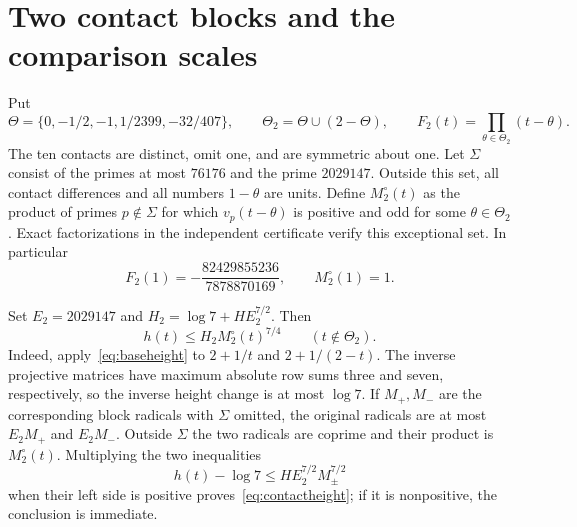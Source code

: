 \documentclass[11pt,a4paper]{article}
\begin{document}
\section{Two contact blocks and the comparison scales}
Put
\[
 \Theta=\{0,-1/2,-1,1/2399,-32/407\},\qquad
 \Theta_2=\Theta\cup(2-\Theta),\qquad
 F_2(t)=\prod_{\theta\in\Theta_2}(t-\theta).
\]
The ten contacts are distinct, omit one, and are symmetric about one.
Let $\Sigma$ consist of the primes at most $76176$ and the prime
$2029147$. Outside this set, all contact differences and all numbers
$1-\theta$ are units. Define $M_2^\circ(t)$ as the product of primes
$p\notin\Sigma$ for which $v_p(t-\theta)$ is positive and odd for
some $\theta\in\Theta_2$. Exact factorizations in the independent
certificate verify this exceptional set. In particular
\[
 F_2(1)=-\frac{82429855236}{7878870169},\qquad M_2^\circ(1)=1.
\]

Set $E_2=2029147$ and $H_2=\log7+HE_2^{7/2}$. Then
\begin{equation}\label{eq:contactheight}
                   h(t)\le H_2M_2^\circ(t)^{7/4}
                   \qquad(t\notin\Theta_2).
\end{equation}
Indeed, apply~\eqref{eq:baseheight} to $2+1/t$ and $2+1/(2-t)$.
The inverse projective matrices have maximum absolute row sums three
and seven, respectively, so the inverse height change is at most
$\log7$. If $M_+,M_-$ are the corresponding block radicals with
$\Sigma$ omitted, the original radicals are at most $E_2M_+$ and
$E_2M_-$. Outside $\Sigma$ the two radicals are coprime and their
product is $M_2^\circ(t)$. Multiplying the two inequalities
\[
              h(t)-\log7\le HE_2^{7/2}M_\pm^{7/2}
\]
when their left side is positive proves~\eqref{eq:contactheight};
if it is nonpositive, the conclusion is immediate.
\end{document}
